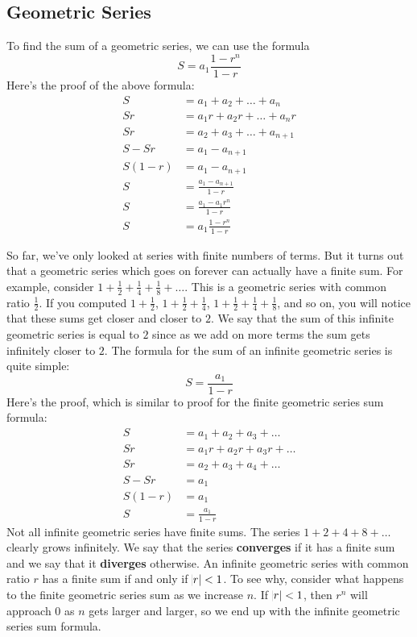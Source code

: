 \documentclass[twocolumn]{article}
\begin{document}
    \subsection*{Geometric Series}
    To find the sum of a geometric series, we can use the formula
    \[S = a_1 \frac{1 - r^n}{1 - r}\] Here's the proof of the above formula:
    \begin{align*}
        S &= a_1 + a_2 + \dots + a_n \\
        Sr &= a_1 r + a_2 r + \dots + a_n r \\
        Sr &= a_2 + a_3 + \dots + a_{n + 1} \\
        S - Sr &= a_1 - a_{n + 1} \\
        S(1 - r) &= a_1 - a_{n + 1} \\
        S &= \frac{a_1 - a_{n + 1}}{1 - r} \\
        S &= \frac{a_1 - a_1 r^n}{1 - r} \\
        S &= a_1 \frac{1 - r^n}{1 - r}
    \end{align*}

    So far, we've only looked at series with finite numbers of terms. But it
    turns out that a geometric series which goes on forever can actually
    have a finite sum. For example, consider $1 + \frac{1}{2} + \frac{1}{4}
    + \frac{1}{8} + \dots$. This is a geometric series with common ratio
    $\frac{1}{2}$. If you computed $1 + \frac{1}{2}$, $1 + \frac{1}{2} +
    \frac{1}{4}$, $1 + \frac{1}{2} + \frac{1}{4} + \frac{1}{8}$, and so on,
    you will notice that these sums get closer and closer to $2$. We say
    that the sum of this infinite geometric series is equal to $2$ since as
    we add on more terms the sum gets infinitely closer to $2$. The formula
    for the sum of an infinite geometric series is quite simple:
    \[S = \frac{a_1}{1 - r}\] Here's the proof, which is similar to proof
    for the finite geometric series sum formula:
    \begin{align*}
        S &= a_1 + a_2 + a_3 + \dots \\
        Sr &= a_1 r + a_2 r + a_3 r + \dots \\
        Sr &= a_2 + a_3 + a_4 + \dots \\
        S - Sr &= a_1 \\
        S(1 - r) &= a_1 \\
        S &= \frac{a_1}{1 - r}
    \end{align*}
    Not all infinite geometric series have finite sums. The series $1 + 2 +
    4 + 8 + \dots$ clearly grows infinitely. We say that the series
    \textbf{converges} if it has a finite sum and we say that it
    \textbf{diverges} otherwise. An infinite geometric series with common
    ratio $r$ has a finite sum if and only if $\abs{r} < 1$. To see why,
    consider what happens to the finite geometric series sum as we increase
    $n$. If $\abs{r} < 1$, then $r^n$ will approach $0$ as $n$ gets larger
    and larger, so we end up with the infinite geometric series sum formula.
\end{document}
